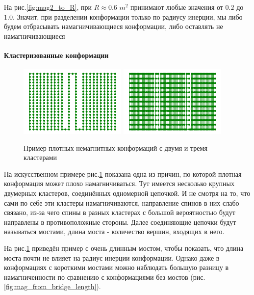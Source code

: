 На рис.\ref{fig:mag2_to_R}, при $R \approx 0.6$ $m^2$ принимают любые значения от $0.2$ до $1.0$. Значит, при разделении конформации только по радиусу инерции, мы либо будем отбрасывать намагничивающиеся конформации, либо оставлять не намагничивающиеся

\paragraph{Кластеризованные конформации}

\begin{figure}[h!]
	\centering
	\includegraphics[width=0.47\textwidth]{../images/2Cluster_conformation.png}
	\includegraphics[width=0.47\textwidth]{../images/3Cluster_conformation.png} 
	\caption{Пример плотных немагнитных конформаций с двумя и тремя кластерами}
	\label{fig:synth_cluster_conf}
\end{figure}

На искусственном примере рис.\ref{fig:synth_cluster_conf} показана одна из причин, по которой плотная конформация может плохо намагничиваться. Тут имеется несколько крупных двумерных кластеров, соединённых одномерной цепочкой. И не смотря на то, что сами по себе эти кластеры намагничиваются, направление спинов в них слабо связано, из-за чего спины в разных кластерах с большой вероятностью будут направлены в противоположные стороны. Далее соединяющие цепочки будут называться мостами, длина моста - количество вершин, входящих в него.

На рис.\ref{fig:synth_cluster_conf} приведён пример с очень длинным мостом, чтобы показать, что длина моста почти не влияет на радиус инерции конформации. Однако даже в конформациях с короткими мостами можно наблюдать большую разницу в намагниченности по сравнению с конформациями без мостов (рис.\ref{fig:mag_from_bridge_length}). 

